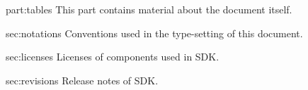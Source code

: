 \begin{partDescription}{part:tables}
  {
    This part contains material about the document itself.
  }
\item[sec:notations]
  Conventions used in the type-setting of this document.

\item[sec:licenses]
  Licenses of components used in \urbi SDK.

\item[sec:revisions]
  Release notes of \urbi SDK.

\end{partDescription}


